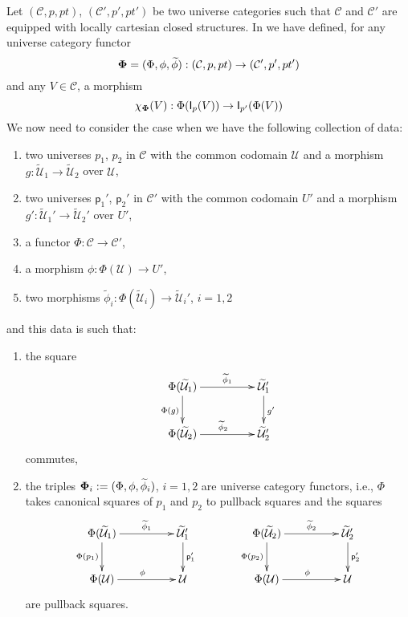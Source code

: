 \documentclass[12pt]{article}
\numberwithin{equation}{section}
\newcommand{\sr}{\rightarrow}
\newcommand{\wt}{\widetilde}
\newcommand{\spc}{{\,\,\,\,\,\,\,}}
\newcommand{\p}{\mathsf{p}}
\newcommand{\U}{\mathcal{U}}
\newcommand{\I}{\mathsf{I}}
\begin{document}
Let $({\mathcal C},p,pt)$, $({\mathcal C}',p',pt')$ be two universe categories
such that $\mathcal C$ and $\mathcal C'$ are equipped with locally cartesian
closed structures. In \cite[Construction 5.6]{fromunivwithPi} we have defined,
for any universe category functor
%
$${\bf\Phi}=(\Phi,\phi,\wt{\phi}):({\mathcal C},p,pt)\sr ({\mathcal
  C}',p',pt')$$
%
and any $V\in {\mathcal C}$, a morphism
%
$$\chi_{\bf\Phi}(V):\Phi(\I_p(V))\sr \I_{p'}(\Phi(V))$$
%
We now need to consider the case when we have the following collection of data:
%
\begin{enumerate}
\item two universes $p_1$, $p_2$ in $\mathcal C$ with the common codomain $\U$
  and a morphism $g:\wt{\U}_1\sr \wt{\U}_2$ over $\U$,
\item two universes $\p_1'$, $\p_2'$ in $\mathcal C'$ with the common codomain
  $U'$ and a morphism $g':\wt{\U}_1'\sr \wt{\U}_2'$ over $U'$,
\item a functor $\Phi:{\mathcal C}\sr {\mathcal C}'$,
\item a morphism $\phi:\Phi(\U)\sr U'$,
\item two morphisms $\wt{\phi}_i:\Phi(\wt{\U}_i)\sr \wt{\U}_i'$, $i=1,2$
\end{enumerate}
%
and this data is such that:
%
\begin{enumerate}
\item the square
%
$$
\begin{xy}
          \xymatrix@C=4pc{ \Phi(\wt{\U}_1) \ar[r]^-{\wt{\phi}_1}
            \ar[d]_{\Phi(g)} & \wt{\U}_1' \ar[d]^{g'}\\ \Phi(\wt{\U}_2)
            \ar[r]^{\wt{\phi}_2} & \wt{\U}_2' }
\end{xy}
$$
%
commutes,
%
\item the triples ${\bf\Phi}_i:=(\Phi,\phi,\wt{\phi}_i)$, $i=1,2$ are universe
  category functors, i.e.,  $\Phi$ takes canonical squares of $p_1$ and $p_2$ to
  pullback squares and the squares
%
$$
\begin{xy}
          \xymatrix@C=4pc{ \Phi(\wt{\U}_1) \ar[r]^-{\wt{\phi}_1}
            \ar[d]_{\Phi(p_1)} & \wt{\U}_1' \ar[d]^{\p_1'}\\ \Phi(\U)
            \ar[r]^{\phi} & \U }
\end{xy}
\spc\spc\spc
\begin{xy}
          \xymatrix@C=4pc{ \Phi(\wt{\U}_2) \ar[r]^-{\wt{\phi}_2}
            \ar[d]_{\Phi(p_2)} & \wt{\U}_2' \ar[d]^{\p_2'}\\ \Phi(\U)
            \ar[r]^{\phi} & \U }
\end{xy}
$$
%
are pullback squares.
\end{enumerate}
\end{document}
